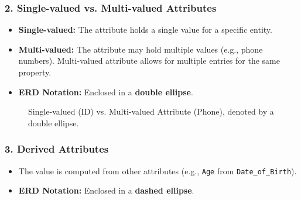 \documentclass[12pt,a4paper]{article}
\begin{document}
\subsubsection{2. Single-valued vs. Multi-valued Attributes}
\begin{itemize}
    \item \textbf{Single-valued:} The attribute holds a single value for a specific entity.
    \item \textbf{Multi-valued:} The attribute may hold multiple values (e.g., phone numbers). Multi-valued attribute allows for multiple entries for the same property.
    \item \textbf{ERD Notation:} Enclosed in a \textbf{double ellipse}.
\end{itemize}
\begin{figure}[H]
    \centering
    \caption{Single-valued (ID) vs. Multi-valued Attribute (Phone), denoted by a double ellipse.}
\end{figure}
\subsubsection{3. Derived Attributes}
\begin{itemize}
    \item The value is computed from other attributes (e.g., \texttt{Age} from \texttt{Date\_of\_Birth}).
    \item \textbf{ERD Notation:} Enclosed in a \textbf{dashed ellipse}.
\end{itemize}
\end{document}
